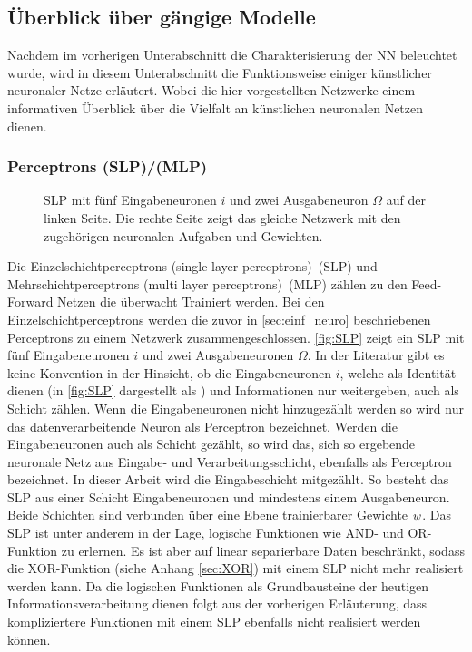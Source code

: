 \subsection{Überblick über gängige Modelle}\label{sec:ANN-Modelle}
Nachdem im vorherigen Unterabschnitt die Charakterisierung der NN beleuchtet wurde, wird in diesem Unterabschnitt die Funktionsweise einiger künstlicher neuronaler Netze erläutert. Wobei die hier vorgestellten Netzwerke einem informativen Überblick über die Vielfalt an künstlichen neuronalen Netzen dienen.

\subsubsection{Perceptrons (SLP)/(MLP)}
\begin{figure}[!htb]
    \centering
        
    \caption{SLP mit fünf Eingabeneuronen $i$ und zwei Ausgabeneuron $\Omega$ auf der linken Seite. Die rechte Seite zeigt das gleiche Netzwerk mit den zugehörigen neuronalen Aufgaben und Gewichten.}
    \label{fig:SLP}
\end{figure}
Die Einzelschichtperceptrons (single layer perceptrons)~(SLP) und Mehrschichtperceptrons (multi layer perceptrons)~(MLP) zählen zu den Feed-Forward Netzen die überwacht Trainiert werden. Bei den Einzelschichtperceptrons werden die zuvor in \autoref{sec:einf_neuro} beschriebenen Perceptrons zu einem Netzwerk zusammengeschlossen. \autoref{fig:SLP} zeigt ein SLP mit fünf Eingabeneuronen $i$ und zwei Ausgabeneuronen $\Omega$. In der Literatur gibt es keine Konvention in der Hinsicht, ob die Eingabeneuronen $i$, welche als Identität dienen (in \autoref{fig:SLP} dargestellt als ) und Informationen nur weitergeben, auch als Schicht zählen. Wenn die Eingabeneuronen nicht hinzugezählt werden so wird nur das datenverarbeitende Neuron  als Perceptron bezeichnet. Werden die Eingabeneuronen auch als Schicht gezählt, so wird das, sich so ergebende neuronale Netz aus Eingabe- und Verarbeitungsschicht, ebenfalls als Perceptron bezeichnet. In dieser Arbeit wird die Eingabeschicht mitgezählt. So besteht das SLP aus einer Schicht Eingabeneuronen und mindestens einem Ausgabeneuron. Beide Schichten sind verbunden über \underline{eine} Ebene trainierbarer Gewichte $\text{\textit{w}}$. Das SLP ist unter anderem in der Lage, logische Funktionen wie AND- und OR-Funktion zu erlernen. Es ist aber auf linear separierbare Daten beschränkt, sodass die XOR-Funktion (siehe Anhang \ref{sec:XOR}) mit einem SLP nicht mehr realisiert werden kann. Da die logischen Funktionen als Grundbausteine der heutigen Informationsverarbeitung dienen folgt aus der vorherigen Erläuterung, dass kompliziertere Funktionen mit einem SLP ebenfalls nicht realisiert werden können.
